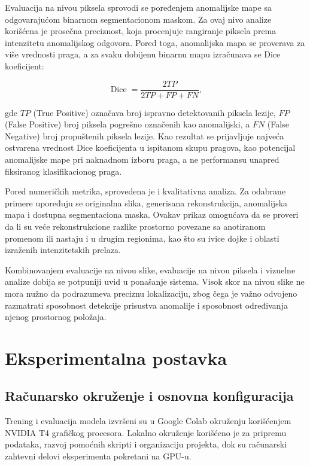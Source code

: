 \documentclass[10pt]{article}
\begin{document}
	Evaluacija na nivou piksela sprovodi se poređenjem anomalijske mape sa odgovarajućom binarnom segmentacionom maskom. Za ovaj nivo analize korišćena je prosečna preciznost, koja procenjuje rangiranje piksela prema intenzitetu anomalijskog odgovora. Pored toga, anomalijska mapa se proverava za više vrednosti praga, a za svaku dobijenu binarnu mapu izračunava se Dice koeficijent:
	
	$$
	\operatorname{Dice}
	=
	\frac{2TP}{2TP+FP+FN},
	$$
	
	gde $TP$ (True Positive) označava broj ispravno detektovanih piksela lezije, $FP$ (False Positive) broj piksela pogrešno označenih kao anomalijski, a $FN$ (False Negative) broj propuštenih piksela lezije. Kao rezultat se prijavljuje najveća ostvarena vrednost Dice koeficijenta u ispitanom skupu pragova, kao potencijal anomalijske mape pri naknadnom izboru praga, a ne performansu unapred fiksiranog klasifikacionog praga.
	
	Pored numeričkih metrika, sprovedena je i kvalitativna analiza. Za odabrane primere upoređuju se originalna slika, generisana rekonstrukcija, anomalijska mapa i dostupna segmentaciona maska. Ovakav prikaz omogućava da se proveri da li su veće rekonstrukcione razlike prostorno povezane sa anotiranom promenom ili nastaju i u drugim regionima, kao što su ivice dojke i oblasti izraženih intenzitetskih prelaza.
	
	Kombinovanjem evaluacije na nivou slike, evaluacije na nivou piksela i vizuelne analize dobija se potpuniji uvid u ponašanje sistema. Visok skor na nivou slike ne mora nužno da podrazumeva preciznu lokalizaciju, zbog čega je važno odvojeno razmatrati sposobnost detekcije prisustva anomalije i sposobnost određivanja njenog prostornog položaja.
	
	\section{Eksperimentalna postavka}
	
	\subsection{Računarsko okruženje i osnovna konfiguracija}
	
	Trening i evaluacija modela izvršeni su u Google Colab okruženju korišćenjem NVIDIA T4 grafičkog procesora. Lokalno okruženje korišćeno je za pripremu podataka, razvoj pomoćnih skripti i organizaciju projekta, dok su računarski zahtevni delovi eksperimenta pokretani na GPU-u.
	
\end{document}
